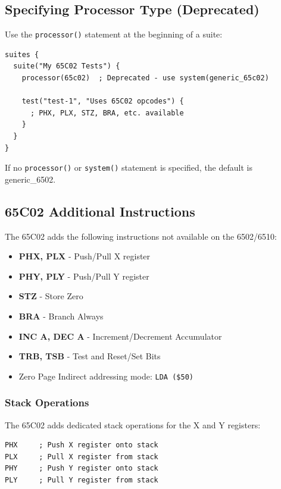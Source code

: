 \documentclass[11pt,letterpaper]{article}
\begin{document}
\subsection{Specifying Processor Type (Deprecated)}

Use the \texttt{processor()} statement at the beginning of a suite:

\begin{verbatim}
suites {
  suite("My 65C02 Tests") {
    processor(65c02)  ; Deprecated - use system(generic_65c02)

    test("test-1", "Uses 65C02 opcodes") {
      ; PHX, PLX, STZ, BRA, etc. available
    }
  }
}
\end{verbatim}

If no \texttt{processor()} or \texttt{system()} statement is specified, the default is generic\_6502.

\subsection{65C02 Additional Instructions}

The 65C02 adds the following instructions not available on the 6502/6510:

\begin{itemize}
    \item \textbf{PHX, PLX} - Push/Pull X register
    \item \textbf{PHY, PLY} - Push/Pull Y register
    \item \textbf{STZ} - Store Zero
    \item \textbf{BRA} - Branch Always
    \item \textbf{INC A, DEC A} - Increment/Decrement Accumulator
    \item \textbf{TRB, TSB} - Test and Reset/Set Bits
    \item Zero Page Indirect addressing mode: \texttt{LDA (\$50)}
\end{itemize}

\subsubsection{Stack Operations}

The 65C02 adds dedicated stack operations for the X and Y registers:

\begin{verbatim}
PHX     ; Push X register onto stack
PLX     ; Pull X register from stack
PHY     ; Push Y register onto stack
PLY     ; Pull Y register from stack
\end{verbatim}
\end{document}
